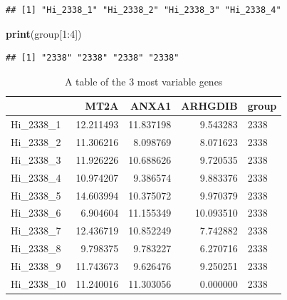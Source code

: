\documentclass[]{article}
\newenvironment{Shaded}{\begin{snugshade}}{\end{snugshade}}
\newcommand{\KeywordTok}[1]{\textcolor[rgb]{0.13,0.29,0.53}{\textbf{{#1}}}}
\newcommand{\DataTypeTok}[1]{\textcolor[rgb]{0.13,0.29,0.53}{{#1}}}
\newcommand{\DecValTok}[1]{\textcolor[rgb]{0.00,0.00,0.81}{{#1}}}
\newcommand{\StringTok}[1]{\textcolor[rgb]{0.31,0.60,0.02}{{#1}}}
\newcommand{\OtherTok}[1]{\textcolor[rgb]{0.56,0.35,0.01}{{#1}}}
\newcommand{\NormalTok}[1]{{#1}}
\numberwithin{figure}{section}
\numberwithin{table}{section}
\theoremstyle{definition}
\theoremstyle{definition}
\theoremstyle{definition}
\theoremstyle{remark}
\begin{document}
\begin{verbatim}
## [1] "Hi_2338_1" "Hi_2338_2" "Hi_2338_3" "Hi_2338_4"
\end{verbatim}

\begin{Shaded}
\begin{Highlighting}[]
\KeywordTok{print}\NormalTok{(group[}\DecValTok{1}\NormalTok{:}\DecValTok{4}\NormalTok{])}
\end{Highlighting}
\end{Shaded}

\begin{verbatim}
## [1] "2338" "2338" "2338" "2338"
\end{verbatim}

\begin{Shaded}
\end{Shaded}

\begin{table}

\caption{\label{tab:addgrp}A table of the 3 most variable genes}
\centering
\begin{tabular}[t]{lrrrl}
\toprule
  & MT2A & ANXA1 & ARHGDIB & group\\
\midrule
Hi\_2338\_1 & 12.211493 & 11.837198 & 9.543283 & 2338\\
Hi\_2338\_2 & 11.306216 & 8.098769 & 8.071623 & 2338\\
Hi\_2338\_3 & 11.926226 & 10.688626 & 9.720535 & 2338\\
Hi\_2338\_4 & 10.974207 & 9.386574 & 9.883376 & 2338\\
Hi\_2338\_5 & 14.603994 & 10.375072 & 9.970379 & 2338\\
\addlinespace
Hi\_2338\_6 & 6.904604 & 11.155349 & 10.093510 & 2338\\
Hi\_2338\_7 & 12.436719 & 10.852249 & 7.742882 & 2338\\
Hi\_2338\_8 & 9.798375 & 9.783227 & 6.270716 & 2338\\
Hi\_2338\_9 & 11.743673 & 9.626476 & 9.250251 & 2338\\
Hi\_2338\_10 & 11.240016 & 11.303056 & 0.000000 & 2338\\
\bottomrule
\end{tabular}
\end{table}
\end{document}
